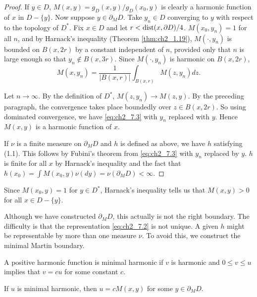 \begin{proof}
If $y \in D$, $M(x,y) = g_D(x,y)/g_D(x_0,y)$ is clearly a harmonic function of $x$ in $D - \{y\}$. Now suppose $y \in \partial_M D$. Take $y_n \in D$ converging to $y$ with respect to the topology of $D^*$. Fix $x \in D$ and let $r < \operatorname{dist}(x,\partial D)/4$. $M(x_0,y_n) = 1$ for all $n$, and by Harnack's inequality (Theorem \ref{thm:ch2_1.19}), $M(\cdot,y_n)$ is bounded on $B(x,2r)$ by a constant independent of $n$, provided only that $n$ is large enough so that $y_n \notin B(x,3r)$. Since $M(\cdot,y_n)$ is harmonic on $B(x,2r)$,
\begin{equation}\label{eq:ch2_7.3}
        M(x,y_n) = \frac{1}{|B(x,r)|}\int_{B(x,r)} M(z,y_n)dz.
\end{equation}

Let $n \to \infty$. By the definition of $D^*$, $M(z,y_n) \to M(z,y)$. By the preceding paragraph, the convergence takes place boundedly over $z \in B(x,2r)$. So using dominated convergence, we have \eqref{eq:ch2_7.3} with $y_n$ replaced with $y$. Hence $M(x,y)$ is a harmonic function of $x$.

If $\nu$ is a finite measure on $\partial_M D$ and $h$ is defined as above, we have $h$ satisfying (1.1). This follows by Fubini's theorem from \eqref{eq:ch2_7.3} with $y_n$ replaced by $y$. $h$ is finite for all $x$ by Harnack's inequality and the fact that $h(x_0) = \int M(x_0,y)\nu(dy) = \nu(\partial_M D) < \infty$.
\end{proof}

Since $M(x_0,y) = 1$ for $y \in D^*$, Harnack's inequality tells us that $M(x,y) > 0$ for all $x \in D - \{y\}$.


Although we have constructed $\partial_M D$, this actually is not the right boundary. The difficulty is that the representation \eqref{eq:ch2_7.2} is not unique. A given $h$ might be representable by more than one measure $\nu$. To avoid this, we construct the minimal Martin boundary.

\begin{definition}\label{def:ch2_7.4}
A positive harmonic function is minimal harmonic if $v$ is harmonic and $0 \leq v \leq u$ implies that $v = cu$ for some constant $c$.
\end{definition}

\begin{proposition}\label{prop:ch2_7.5}
If $u$ is minimal harmonic, then $u = cM(x,y)$ for some $y \in \partial_M D$.
\end{proposition}

